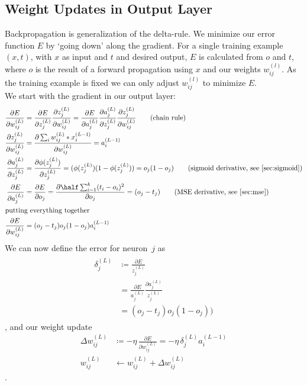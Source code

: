 \subsection{Weight Updates in Output Layer}
Backpropagation is generalization of the delta-rule. We minimize our error function $E$ by `going down' along the gradient. For a single training example~$(x, t)$, with $x$ as input and $t$ and desired output, $E$ is calculated from $o$ and $t$, where $o$ is the result of a forward propagation using $x$ and our weights $w_{ij}^{(l)}$. As the training example is fixed we can only adjust $w_{ij}^{(l)}$ to minimize $E$.\\
We start with the gradient in our output layer:
\begin{align}
\frac{\partial E}{\partial w_{ij}^{(L)}} &= \frac{\partial E}{\partial z_j^{(L)}} \frac{\partial z_j^{(L)}}{\partial w_{ij}^{(L)}}
= \frac{\partial E}{\partial a_j^{(L)}} \frac{\partial a_j^{(L)}}{\partial z_j^{(L)}} \frac{\partial z_j^{(L)}}{\partial w_{ij}^{(L)}}
 \tag{chain rule}\\
\frac{\partial z_j^{(L)}}{\partial w_{ij}^{(L)}} &= \frac{\partial \sum_i w_{ij}^{(L)} * x_i^{(L-1)} }{\partial w_{ij}^{(L)}}
= a_i^{(L-1)}\\
\frac{\partial a_j^{(L)}}{\partial z_j^{(L)}} &= \frac{\partial \phi(z_j^{(L)})}{\partial z_j^{(L)}}
= (\phi(z_j^{(L)}) (1 - \phi(z_j^{(L)}))
= o_j (1 - o_j) \tag{sigmoid derivative, see \ref{sec:sigmoid}} \\
\frac{\partial E}{\partial a_j^{(L)}} &= \frac{\partial E}{\partial o_j}
= \frac{\partial \half \sum_{i=1}^k (t_i - o_i)^2}{\partial o_j}
= (o_j - t_j) \tag{MSE derivative, see \ref{sec:mse}}\\
\intertext{putting everything together}
\frac{\partial E}{\partial w_{ij}^{(L)}} &= (o_j - t_j) o_j (1 - o_j) a_i^{(L-1)}
\end{align}
We can now define the error for neuron~$j$ as
\begin{align}
\begin{split}
\delta_j^{(L)} &\coloneqq \frac{\partial E}{z_j^{(L)}}\\
&= \frac{\partial E}{a_j^{(L)}} \frac{\partial a_j^{(L)}}{z_j^{(L)}}\\
&= (o_j - t_j) o_j (1 - o_j))
\end{split}
\end{align}
, and our weight update
\begin{align}
\Delta w_{ij}^{(L)} &\coloneqq - \eta\, \frac{\partial E}{\partial w_{ij}^{(L)}}
= - \eta\, \delta_j^{(L)} a_i^{(L-1)}\\
w_{ij}^{(L)} &\leftarrow w_{ij}^{(L)} + \Delta w_{ij}^{(L)}
\end{align}
.


